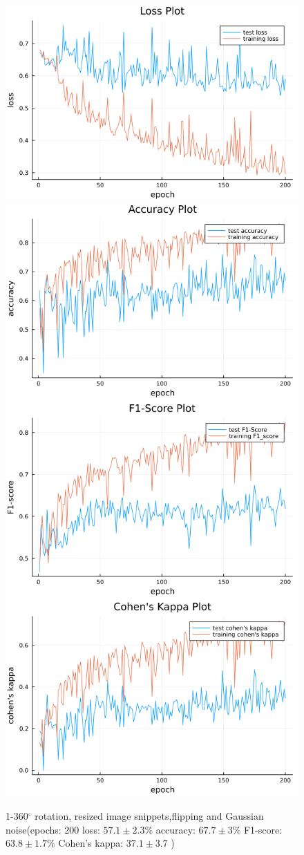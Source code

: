 \documentclass[
a4paper, 
12pt,
grayscalebody, %
abstract=on,
twoside, BCOR10mm, 12pt, DIV13,headinclude, footexclude, final, abstracton, openright
]{ibireprt}
\numberwithin{equation}{chapter}
\numberwithin{table}{chapter}
\numberwithin{figure}{chapter}
\numberwithin{algorithm}{chapter}
\numberwithin{example}{chapter}
\numberwithin{example}{chapter}
\begin{document}
\begin{figure}
	\includegraphics[width=0.4\linewidth]{loss_png_final_run_0_5.png}\hfill
\includegraphics[width=0.4\linewidth]{accuracy_png_final_run_0_5.png}
\\[\smallskipamount]
\includegraphics[width=0.4\linewidth]{f1_score_png_final_run_0_5.png}\hfill
\includegraphics[width=0.4\linewidth]{cohens_kappa_png_final_run_0_5.png}
	\caption{1-360$^{\circ}$ rotation, resized image snippets,flipping and Gaussian noise(epochs: 200 loss: $57.1\pm2.3\% $ accuracy: $67.7\pm3\%$ F1-score: $63.8\pm1.7\%$  Cohen's kappa: $37.1\pm3.7$ )}
\end{figure}%
\end{document}
